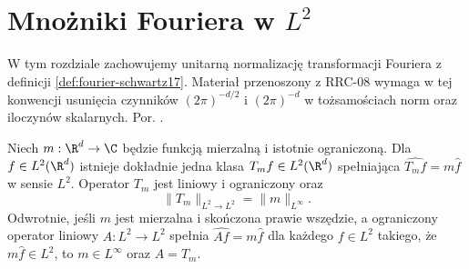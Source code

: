 \setcounter{section}{13}
\section{Mnożniki Fouriera w \texorpdfstring{$L^2$}{L2}}
\label{sec:dt-multipliers-l2}

W tym rozdziale zachowujemy unitarną normalizację
transformacji Fouriera z definicji \ref{def:fourier-schwartz17}.
Materiał przenoszony z RRC-08 wymaga w tej konwencji
usunięcia czynników $(2\pi)^{-d/2}$ i $(2\pi)^{-d}$ w
tożsamościach norm oraz iloczynów skalarnych.
Por. .


\begin{twierdzenie}[Mnożnik w $L^2$]
\label{thm:dt-multiplier-l2}
Niech $m:\R^d\to\C$ będzie funkcją mierzalną i
istotnie ograniczoną. Dla $f\in L^2(\R^d)$ istnieje
dokładnie jedna klasa $T_mf\in L^2(\R^d)$ spełniająca
$\widehat{T_mf}=m\widehat f$ w sensie $L^2$.
Operator $T_m$ jest liniowy i ograniczony oraz
\[
 \|T_m\|_{L^2\to L^2}=\|m\|_{L^\infty}.
\]
Odwrotnie, jeśli $m$ jest mierzalna i skończona
prawie wszędzie, a ograniczony operator liniowy
$A:L^2\to L^2$ spełnia $\widehat{Af}=m\widehat f$
dla każdego $f\in L^2$ takiego, że
$m\widehat f\in L^2$, to $m\in L^\infty$
oraz $A=T_m$.
\end{twierdzenie}
